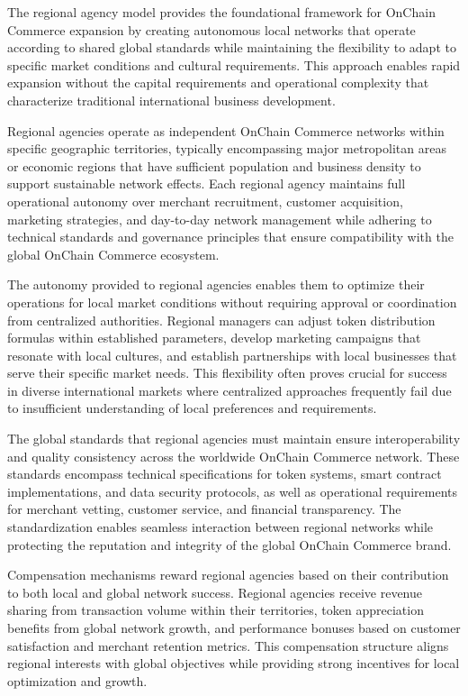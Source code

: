 \documentclass[
  Letterpaper,
]{scrbook}
\begin{document}
The regional agency model provides the foundational framework for
OnChain Commerce expansion by creating autonomous local networks that
operate according to shared global standards while maintaining the
flexibility to adapt to specific market conditions and cultural
requirements. This approach enables rapid expansion without the capital
requirements and operational complexity that characterize traditional
international business development.

Regional agencies operate as independent OnChain Commerce networks
within specific geographic territories, typically encompassing major
metropolitan areas or economic regions that have sufficient population
and business density to support sustainable network effects. Each
regional agency maintains full operational autonomy over merchant
recruitment, customer acquisition, marketing strategies, and day-to-day
network management while adhering to technical standards and governance
principles that ensure compatibility with the global OnChain Commerce
ecosystem.

The autonomy provided to regional agencies enables them to optimize
their operations for local market conditions without requiring approval
or coordination from centralized authorities. Regional managers can
adjust token distribution formulas within established parameters,
develop marketing campaigns that resonate with local cultures, and
establish partnerships with local businesses that serve their specific
market needs. This flexibility often proves crucial for success in
diverse international markets where centralized approaches frequently
fail due to insufficient understanding of local preferences and
requirements.

The global standards that regional agencies must maintain ensure
interoperability and quality consistency across the worldwide OnChain
Commerce network. These standards encompass technical specifications for
token systems, smart contract implementations, and data security
protocols, as well as operational requirements for merchant vetting,
customer service, and financial transparency. The standardization
enables seamless interaction between regional networks while protecting
the reputation and integrity of the global OnChain Commerce brand.

Compensation mechanisms reward regional agencies based on their
contribution to both local and global network success. Regional agencies
receive revenue sharing from transaction volume within their
territories, token appreciation benefits from global network growth, and
performance bonuses based on customer satisfaction and merchant
retention metrics. This compensation structure aligns regional interests
with global objectives while providing strong incentives for local
optimization and growth.
\end{document}
